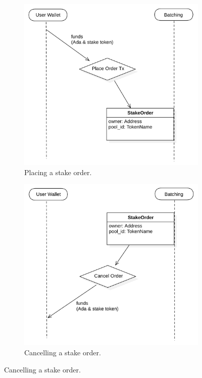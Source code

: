 \documentclass[12pt,parskip=full, tikz]{article}
\begin{document}
\begin{figure}
    \centering
    \begin{subfigure}[b]{0.45\textwidth}
        \centering
        \includegraphics[width=\textwidth]{figures/place-stake-order.png}
        \caption{Placing a stake order.}
        \label{fig:place-stake-order}
    \end{subfigure}
    \hfill
    \begin{subfigure}[b]{0.45\textwidth}
        \centering
        \includegraphics[width=\textwidth]{figures/cancel-stake-order.png}
        \caption{Cancelling a stake order.}
        \label{fig:cancel-stake-order}
    \end{subfigure}
\end{figure}
\end{document}
